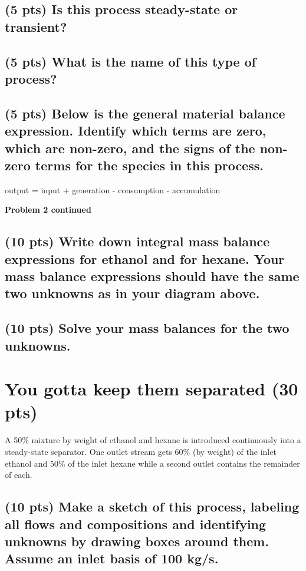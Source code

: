 \documentclass[11pt]{article}
\begin{document}
\subsection{(5 pts) Is this process steady-state or transient?}
\label{sec-2-2}
\vspace{1.5cm}
\subsection{(5 pts) What is the name of this type of process?}
\label{sec-2-3}
\vspace{1.5cm}
\subsection{(5 pts) Below is the general material balance expression.  Identify which terms are zero, which are non-zero, and the signs of the non-zero terms for the species in this process.}
\label{sec-2-4}
\vspace{0.5cm}
\begin{center}
output = input + generation - consumption - accumulation
\end{center}
\newpage
\noindent \textbf{Problem 2 continued}
\subsection{(10 pts) Write down integral mass balance expressions for ethanol and for hexane.  Your mass balance expressions should have the same two unknowns as in your diagram above.}
\label{sec-2-5}
\vspace{10cm}
\subsection{(10 pts) Solve your mass balances for the two unknowns.}
\label{sec-2-6}
\newpage
\section{You gotta keep them separated (30 pts)}
\label{sec-3}
A 50\% mixture by weight of ethanol and hexane is introduced continuously into a steady-state separator.  One outlet stream gets 60\% (by weight) of the inlet ethanol and 50\% of the inlet hexane while a second outlet contains the remainder of each.

\subsection{(10 pts) Make a sketch of this process, labeling all flows and compositions and identifying unknowns by drawing boxes around them. Assume an inlet basis of 100 kg/s.}
\label{sec-3-1}
\vspace{10cm}
\end{document}

